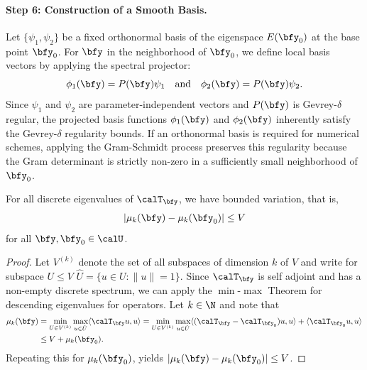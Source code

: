 \paragraph{Step 6: Construction of a Smooth Basis.} 
Let $\{ \psi_1, \psi_2 \}$ be a fixed orthonormal basis of the eigenspace $E(\bfy_0)$ at the base point $\bfy_0$. For $\bfy$ in the neighborhood of $\bfy_0$, we define local basis vectors by applying the spectral projector:
\begin{equation}
    \phi_1(\bfy) = P(\bfy) \psi_1 \quad \text{and} \quad \phi_2(\bfy) = P(\bfy) \psi_2.
\end{equation}
Since $\psi_1$ and $\psi_2$ are parameter-independent vectors and $P(\bfy)$ is Gevrey-$\delta$ regular, the projected basis functions $\phi_1(\bfy)$ and $\phi_2(\bfy)$ inherently satisfy the Gevrey-$\delta$ regularity bounds. If an orthonormal basis is required for numerical schemes, applying the Gram-Schmidt process preserves this regularity because the Gram determinant is strictly non-zero in a sufficiently small neighborhood of $\bfy_0$.




\begin{lemma}
    For all discrete eigenvalues of $\calT_\bfy$, we have bounded variation, that is,
    \begin{align*}
        \vert \mu_k(\bfy) - \mu_k(\bfy_0)  \vert \leq V
    \end{align*}
    for all $ \bfy, \bfy_0 \in \calU$.
\end{lemma}
\begin{proof}
Let $V^{(k)} $ denote the set of all subspaces of dimension $k$ of $V$ and write for subspace  $ U \leq V$
$   \hat U = \{ u \in U :  \| u \| = 1 \}.$
    Since $\calT_\bfy$ is self adjoint and has a non-empty discrete spectrum, we can apply 
    the $\min$-$\max$ Theorem for descending eigenvalues for operators. Let $ k \in \N$ and note that 
    \begin{align*}
         \mu_k(\bfy) &= \min_{U \in V^{(k)}} \max_{ u \in \hat U} \langle \calT_{\bfy} u,u \rangle =   \min_{U \in V^{(k)}} \max_{ u \in \hat U} \langle (\calT_{\bfy}- \calT_{\bfy_0}) u,u  \rangle  + \langle \calT_{\bfy_0} u,u \rangle \\
         & \leq  V + \mu_k(\bfy_0).
    \end{align*} 
    Repeating this for $\mu_k(\bfy_0)$, yields
    $\vert \mu_k(\bfy) - \mu_k(\bfy_0) \vert \leq V$.
\end{proof}



